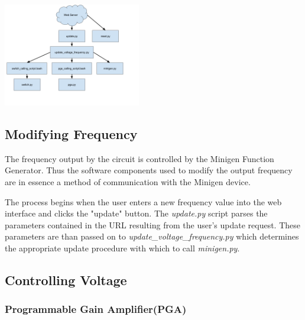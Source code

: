 \documentclass{article}	%
\begin{document}
\begin{multicols}{2}
\begin{center}
\includegraphics[width=0.45\textwidth,keepaspectratio]{script_layout.png}
\end{center}

\subsection{Modifying Frequency}
The frequency output by the circuit is controlled 
by the Minigen Function Generator.
Thus the software components used to 
modify the output frequency
are in essence
a method of communication with the Minigen device.

The process begins when the user 
enters a new frequency value into the web interface
and clicks the "update" button.
The \textit{update.py} script parses 
the parameters contained in the URL
resulting from the user's update request.
These parameters are than
passed on to \textit{update\_voltage\_frequency.py}
which determines the appropriate update procedure 
with which to call \textit{minigen.py}.


\subsection{Controlling Voltage}

\subsubsection{Programmable Gain Amplifier(PGA)}



\end{multicols}
\end{document}
